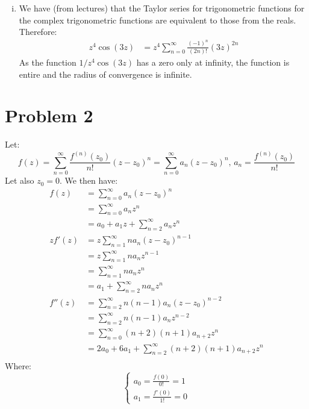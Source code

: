 \documentclass[letterpaper, titlepage, DIV=14]{scrartcl}
\begin{document}
\begin{enumerate}[i)]
      \item We have (from lectures) that the Taylor series for trigonometric functions for the complex trigonometric functions are 
      equivalent to those from the reals. Therefore:
      \begin{align*}
        z^{4}\cos(3z) &= z^{4}\sum_{n=0}^{\infty}\frac{(-1)^{n}}{(2n)!}(3z)^{2n}
      \end{align*}
      As the function $1/z^{4}\cos(3z)$ has a zero only at infinity, the function is entire and the radius of convergence is infinite.
     
    \end{enumerate}
    
    \section*{Problem 2}
    Let:
    \begin{equation*}
      f(z) = \sum_{n=0}^{\infty}\frac{f^{(n)}(z_{0})}{n!}(z-z_{0})^{n} = \sum_{n=0}^{\infty}a_{n}(z-z_{0})^{n}, \, a_{n} = \frac{f^{(n)}(z_{0})}{n!}
    \end{equation*}
    Let also $z_{0}=0$. We then have:
    \begin{align*}
      f(z)  &= \sum_{n=0}^{\infty}a_{n}(z-z_{0})^{n} \\
            &= \sum_{n=0}^{\infty}a_{n}z^{n} \\
            &= a_{0} + a_{1}z + \sum_{n=2}^{\infty}a_{n}z^{n} \\
      zf'(z) &= z\sum_{n=1}^{\infty}na_{n}(z-z_{0})^{n-1} \\
            &= z\sum_{n=1}^{\infty}na_{n}z^{n-1} \\
            &= \sum_{n=1}^{\infty}na_{n}z^{n} \\
            &= a_{1} + \sum_{n=2}^{\infty}na_{n}z^{n} \\
      f''(z) &= \sum_{n=2}^{\infty}n(n-1)a_{n}(z-z_{0})^{n-2} \\
            &= \sum_{n=2}^{\infty}n(n-1)a_{n}z^{n-2} \\
            &= \sum_{n=0}^{\infty}(n+2)(n+1)a_{n+2}z^{n} \\
            &= 2a_{0} + 6a_{1} + \sum_{n=2}^{\infty}(n+2)(n+1)a_{n+2}z^{n} \\
    \end{align*}
    Where:
    \[
      \begin{cases}
        a_{0} = \frac{f(0)}{0!} = 1 \\
        a_{1} = \frac{f'(0)}{1!} = 0
      \end{cases}
    \]
\end{document}
